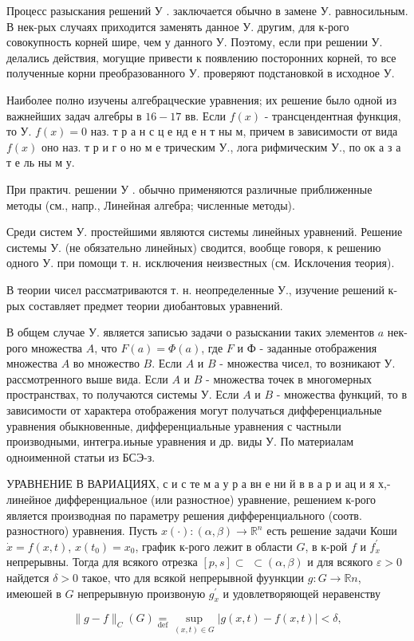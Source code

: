 \documentclass[10pt]{article}
\begin{document}
Процесс разыскания решений У . заключается обычно в замене У. равносильным. В нек-рых случаях приходится заменять данное У. другим, для к-рого совокупность корней шире, чем у данного У. Поэтому, если при решении У. делались действия, могущие привести к появлению посторонних корней, то все полученные корни преобразованного У. проверяют подстановкой в исходное У.



Наиболее полно изучены алгебрацческие уравнения; их решение было одной из важнейших задач алгебры в $16-17$ вв. Если $f(x)$ - трансцендентная функция, то У. $f(x)=0$ наз. т р а н с ц е нд е н т ны м, причем в зависимости от вида $f(x)$ оно наз. т р и г о но м е трическим У., лога рифмическим У., по ок а з а т е ль ны м у.



При практич. решении У . обычно применяются различные приближенные методы (см., напр., Линейная алгебра; численные методы).



Среди систем У. простейшими являются системы линейных уравнений. Решение системы У. (не обязательно линейных) сводится, вообще говоря, к решению одного У. при помощи т. н. исключения неизвестных (см. Исклочения теория).



В теории чисел рассматриваются т. н. неопределенные У., изучение решений к-рых составляет предмет теории диобантовых уравнений.



В общем случае У. является записью задачи о разыскании таких элементов $a$ нек-рого множества $A$, что $F(a)=\Phi(a)$, где $F$ и Ф - заданные отображения множества $A$ во множество $B$. Если $A$ и $B$ - множества чисел, то возникают У. рассмотренного выше вида. Если $A$ и $B$ - множества точек в многомерных пространствах, то получаются системы У. Если $A$ и $B$ - множества функций, то в зависимости от характера отображения могут получаться дифференциальные уравнения обыкновенные, дифференциальные уравнения с частныли производными, интегра.иьные уравнения и др. виды У. По материалам одноименной статьи из БСЭ-з.



УРАВНЕНИЕ В ВАРИАЦИЯХ, с и с те м а у р а вн е ни й в в а р и ац и я х,- линейное дифференциальное (или разностное) уравнение, решением к-рого является производная по параметру решения дифференциального (соотв. разностного) уравнения. Пусть $x(\cdot):(\alpha, \beta) \rightarrow \mathbb{R}^{n}$ есть решение задачи Коши $\dot{x}=f(x, t)$, $x\left(t_{0}\right)=x_{0}$, график к-рого лежит в области $G$, в к-рой $f$ и $f_{x}^{\prime}$ непрерывны. Тогда для всякого отрезка $[p, s] \subset$ $\subset(\alpha, \beta)$ и для всякого $\varepsilon>0$ найдется $\delta>0$ такое, что для всякой непрерывной фуункции $g: G \longrightarrow \mathbb{R} n$, имеюшей в $G$ непрерывную произвоную $g_{x}^{\prime}$ и удовлетворяющей неравенству



\[

\|g-f\|_{C}(G) \underset{\operatorname{def}}{=} \sup _{(x, t) \in G}|g(x, t)-f(x, t)|<\delta,

\]
\end{document}
